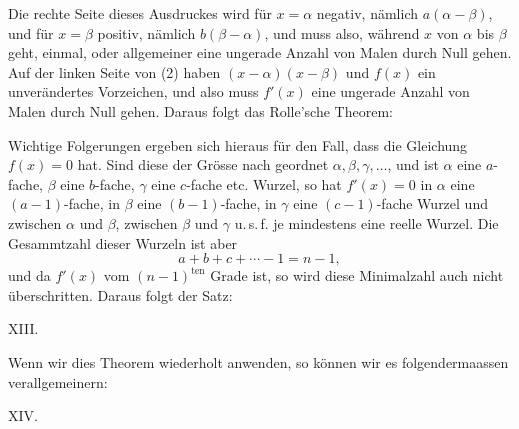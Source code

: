 Die rechte Seite dieses Ausdruckes wird für $x = \alpha$ negativ, nämlich
$a(\alpha - \beta)$, und für $x = \beta$ positiv, nämlich $b(\beta - \alpha)$,
und muss also, während $x$ von $\alpha$ bis $\beta$ geht, einmal, oder
allgemeiner eine ungerade Anzahl von Malen durch Null gehen. Auf der linken
Seite von (2) haben $(x-\alpha)(x-\beta)$ und $f(x)$ ein unverändertes
Vorzeichen, und also muss $f'(x)$ eine ungerade Anzahl von Malen durch Null
gehen. Daraus folgt das Rolle'sche Theorem:


Wichtige Folgerungen ergeben sich hieraus für den Fall, dass die Gleichung
$f(x) = 0$  hat. Sind diese der Grösse nach geordnet
$\alpha, \beta, \gamma, \dots$, und ist $\alpha$ eine $a$-fache, $\beta$ eine
$b$-fache, $\gamma$ eine $c$-fache etc. Wurzel, so hat $f'(x) = 0$ in
$\alpha$ eine $(a-1)$-fache, in $\beta$ eine $(b-1)$-fache, in $\gamma$ eine
$(c-1)$-fache Wurzel und zwischen $\alpha$ und $\beta$, zwischen $\beta$ und
$\gamma$ u.\,s.\,f. je mindestens eine reelle Wurzel. Die Gesammtzahl dieser
Wurzeln ist aber
\[
a + b + c + \cdots - 1 = n - 1,
\]
und da $f'(x)$ vom $(n-1)^{\mathrm{ten}}$ Grade ist, so wird diese
Minimalzahl auch nicht überschritten. Daraus folgt der Satz:

%
XIII. 

Wenn wir dies Theorem wiederholt anwenden, so können wir es
folgendermaassen verallgemeinern:

XIV. 
